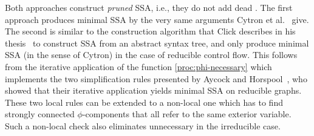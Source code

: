 {Both approaches construct \emph{pruned} SSA, i.e., they do not add dead \phifuns.
The first approach produces minimal SSA by the very same arguments Cytron et al.~\cite{cytron:1991:ssa} give.
The second is similar to the construction algorithm that Click describes in his thesis~\cite{click:thesis} to construct SSA from an abstract syntax tree, and only produce minimal SSA (in the sense of Cytron) in the case of reducible control flow. 
This follows from the iterative application of the function \ref{proc:phi-necessary} which implements the two simplification rules presented by Aycock and Horspool~\cite{Aycock_Horspool_2000}, 
who showed that their iterative application yields minimal SSA on reducible graphs. 
These two local rules can be extended to a non-local one which has to find strongly connected $\phi$-components that all refer to the same exterior variable.
Such a non-local check also eliminates unnecessary \phifuns in the irreducible case.

}
